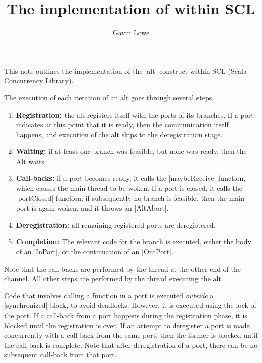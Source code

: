 \documentclass[12pt,a4paper]{article}
\title{The implementation of \SCALA{alt} within SCL}
\author{Gavin Lowe}
\begin{document}
\maketitle

This note outlines the implementation of the |alt| construct within SCL (Scala
Concurrency Library). 

The execution of each iteration of an alt goes through several steps.
%
\begin{enumerate}
\item \textbf{Registration:} the alt registers itself with the ports of its
  branches.  If a port indicates at this point that it is ready, then the
  communication itself happens, and execution of the alt skips to the
  deregistration stage.
    
\item \textbf{Waiting:} if at least one branch was feasible, but none was
  ready, then the Alt waits.
    
\item \textbf{Call-backs:} if a port becomes ready, it calls the
  |maybeReceive| function, which causes the main thread to be woken.  If a
  port is closed, it calls the |portClosed| function; if subsequently no
  branch is feasible, then the main port is again woken, and it throws an
  |AltAbort|.
    
\item \textbf{Deregistration:} all remaining registered ports are
  deregistered.
    
\item \textbf{Completion:} The relevant code for the branch is executed,
  either the body of an |InPort|, or the continuation of an |OutPort|.
\end{enumerate}

Note that the call-backs are performed by the thread at the other end of the
channel.  All other steps are performed by the thread executing the alt.

Code that involves calling a function in a port is executed \emph{outside} a
|synchronized| block, to avoid deadlocks.  However, it is executed using the
lock of the port.  If a call-back from a port happens during the registration
phase, it is blocked until the registration is over.  If an attempt to
deregister a port is made concurrently with a call-back from the same port,
then the former is blocked until the call-back is complete.  Note that after
deregistration of a port, there can be no subsequent call-back from that port.
\end{document}
